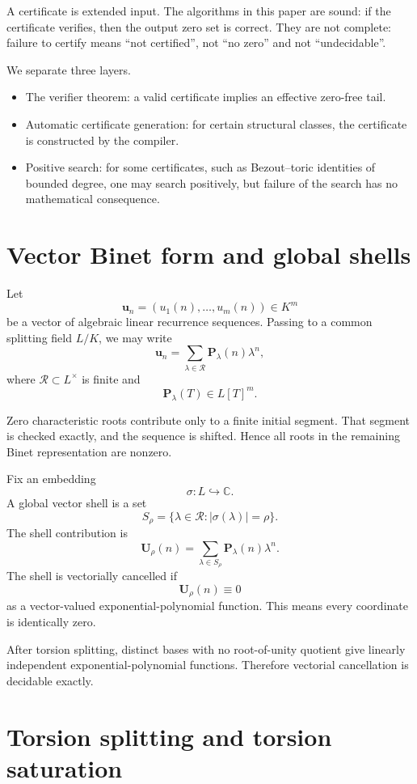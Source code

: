 \documentclass[11pt]{article}
\newcommand{\C}{\mathbb C}
\begin{document}
A certificate is extended input. The algorithms in this paper are sound: if the certificate verifies, then the output zero set is correct. They are not complete: failure to certify means ``not certified'', not ``no zero'' and not ``undecidable''.

We separate three layers.
\begin{itemize}
\item The verifier theorem: a valid certificate implies an effective zero-free tail.
\item Automatic certificate generation: for certain structural classes, the certificate is constructed by the compiler.
\item Positive search: for some certificates, such as Bezout--toric identities of bounded degree, one may search positively, but failure of the search has no mathematical consequence.
\end{itemize}

\section{Vector Binet form and global shells}

Let
\[
\mathbf u_n=(u_1(n),\ldots,u_m(n))\in K^m
\]
be a vector of algebraic linear recurrence sequences. Passing to a common splitting field \(L/K\), we may write
\[
\mathbf u_n=\sum_{\lambda\in\mathcal R}\mathbf P_\lambda(n)\lambda^n,
\]
where \(\mathcal R\subset L^\times\) is finite and
\[
\mathbf P_\lambda(T)\in L[T]^m.
\]

Zero characteristic roots contribute only to a finite initial segment. That segment is checked exactly, and the sequence is shifted. Hence all roots in the remaining Binet representation are nonzero.

Fix an embedding
\[
\sigma:L\hookrightarrow\C.
\]
A global vector shell is a set
\[
S_\rho=\{\lambda\in\mathcal R:|\sigma(\lambda)|=\rho\}.
\]
The shell contribution is
\[
\mathbf U_\rho(n)=\sum_{\lambda\in S_\rho}\mathbf P_\lambda(n)\lambda^n.
\]
The shell is vectorially cancelled if
\[
\mathbf U_\rho(n)\equiv0
\]
as a vector-valued exponential-polynomial function. This means every coordinate is identically zero.

After torsion splitting, distinct bases with no root-of-unity quotient give linearly independent exponential-polynomial functions. Therefore vectorial cancellation is decidable exactly.

\section{Torsion splitting and torsion saturation}
\end{document}
